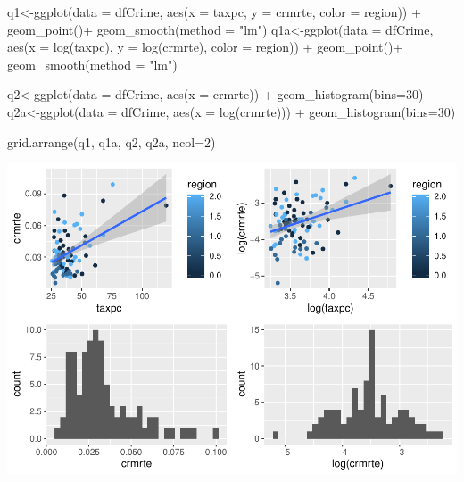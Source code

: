 \documentclass[]{article}
\newenvironment{Shaded}{}{}
\newcommand{\DataTypeTok}[1]{#1}
\newcommand{\DecValTok}[1]{#1}
\newcommand{\KeywordTok}[1]{\textcolor[rgb]{0.00,0.00,1.00}{#1}}
\newcommand{\NormalTok}[1]{#1}
\newcommand{\OperatorTok}[1]{#1}
\newcommand{\StringTok}[1]{\textcolor[rgb]{0.00,0.50,0.50}{#1}}
\begin{document}
\begin{Shaded}
\begin{Highlighting}[]
\NormalTok{q1<-}\KeywordTok{ggplot}\NormalTok{(}\DataTypeTok{data =}\NormalTok{ dfCrime, }\KeywordTok{aes}\NormalTok{(}\DataTypeTok{x =}\NormalTok{ taxpc, }\DataTypeTok{y =}\NormalTok{ crmrte, }\DataTypeTok{color =}\NormalTok{ region)) }\OperatorTok{+}\StringTok{ }
\StringTok{      }\KeywordTok{geom_point}\NormalTok{()}\OperatorTok{+}
\StringTok{  }\KeywordTok{geom_smooth}\NormalTok{(}\DataTypeTok{method =} \StringTok{"lm"}\NormalTok{)}
\NormalTok{q1a<-}\KeywordTok{ggplot}\NormalTok{(}\DataTypeTok{data =}\NormalTok{ dfCrime, }\KeywordTok{aes}\NormalTok{(}\DataTypeTok{x =} \KeywordTok{log}\NormalTok{(taxpc), }\DataTypeTok{y =} \KeywordTok{log}\NormalTok{(crmrte), }\DataTypeTok{color =}\NormalTok{ region)) }\OperatorTok{+}\StringTok{ }
\StringTok{      }\KeywordTok{geom_point}\NormalTok{()}\OperatorTok{+}
\StringTok{  }\KeywordTok{geom_smooth}\NormalTok{(}\DataTypeTok{method =} \StringTok{"lm"}\NormalTok{)}

\NormalTok{q2<-}\KeywordTok{ggplot}\NormalTok{(}\DataTypeTok{data =}\NormalTok{ dfCrime, }\KeywordTok{aes}\NormalTok{(}\DataTypeTok{x =}\NormalTok{ crmrte)) }\OperatorTok{+}\StringTok{ }
\StringTok{      }\KeywordTok{geom_histogram}\NormalTok{(}\DataTypeTok{bins=}\DecValTok{30}\NormalTok{)}
\NormalTok{q2a<-}\KeywordTok{ggplot}\NormalTok{(}\DataTypeTok{data =}\NormalTok{ dfCrime, }\KeywordTok{aes}\NormalTok{(}\DataTypeTok{x =} \KeywordTok{log}\NormalTok{(crmrte))) }\OperatorTok{+}\StringTok{ }
\StringTok{      }\KeywordTok{geom_histogram}\NormalTok{(}\DataTypeTok{bins=}\DecValTok{30}\NormalTok{)}

\KeywordTok{grid.arrange}\NormalTok{(q1, q1a, q2, q2a, }\DataTypeTok{ncol=}\DecValTok{2}\NormalTok{)}
\end{Highlighting}
\end{Shaded}

\includegraphics{Bagnard_Gaustad_Hartman_Leung_Lab_3_files/figure-latex/unnamed-chunk-53-1.pdf}
\end{document}
